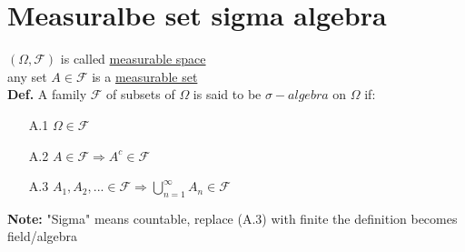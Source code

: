 \newpage
\section{Measuralbe set sigma algebra}
$(\Omega, \mathcal{F})$ is called \underline{measurable space} \\
any set $A \in \mathcal{F}$ is a \underline{measurable set} \\
\textbf{Def.} A family $\mathcal{F}$ of subsets of $\Omega$ is said to be $\sigma-algebra$ on $\Omega$ if:
\begin{itemize}
    \item[A.1] $\Omega \in \mathcal{F}$
    \item[A.2] $A\in \mathcal{F} \Rightarrow A^c \in \mathcal{F}$
    \item[A.3] $A_1,A_2,... \in \mathcal{F} \Rightarrow \bigcup\limits_{n=1}^{\infty}A_n\in \mathcal{F}$
\end{itemize}
\textbf{Note:} "Sigma" means countable, replace (A.3) with finite the definition becomes field/algebra \\[1cm]
